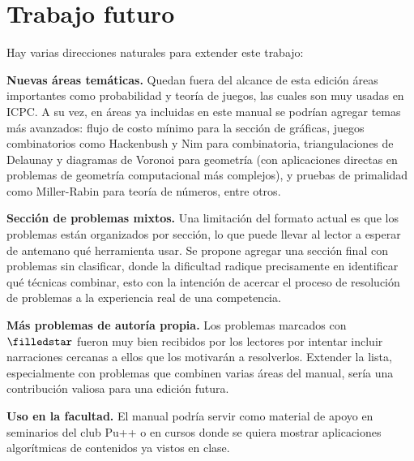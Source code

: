 \section{Trabajo futuro}

Hay varias direcciones naturales para extender este trabajo:

\textbf{Nuevas áreas temáticas.} Quedan fuera del alcance de esta
edición áreas importantes como probabilidad y teoría de juegos, las cuales son muy usadas en ICPC. A su vez, en áreas ya incluidas en este manual se podrían agregar temas más avanzados: flujo de costo mínimo para la sección de gráficas, juegos combinatorios como Hackenbush y Nim para combinatoria, triangulaciones de Delaunay y diagramas de Voronoi para geometría (con aplicaciones directas en problemas de geometría computacional más complejos), y pruebas de primalidad como Miller-Rabin para teoría de números, entre otros.

\textbf{Sección de problemas mixtos.} Una limitación del formato
actual es que los problemas están organizados por sección, lo que
puede llevar al lector a esperar de antemano qué herramienta usar. Se propone agregar una sección final con problemas sin clasificar, donde la dificultad radique precisamente en identificar qué técnicas combinar, esto con la intención de acercar el proceso de resolución de problemas a la experiencia real de una competencia.

\textbf{Más problemas de autoría propia.} Los problemas marcados con $\filledstar$ fueron muy bien recibidos por los lectores por intentar incluir narraciones cercanas a ellos que los motivarán a resolverlos.
Extender la lista, especialmente con problemas que combinen varias áreas del manual, sería una contribución valiosa para una edición futura.

\textbf{Uso en la facultad.} El manual podría servir como material de
apoyo en seminarios del club Pu++ o en cursos donde se quiera mostrar
aplicaciones algorítmicas de contenidos ya vistos en clase.
